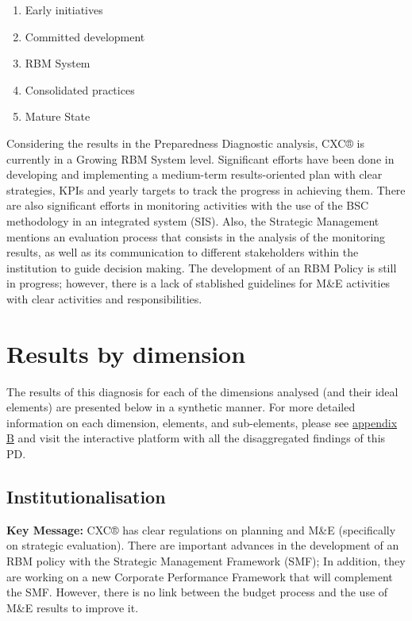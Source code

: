 \documentclass[
  10pt,
]{book}
\providecommand{\tightlist}{%
  \setlength{\itemsep}{0pt}\setlength{\parskip}{0pt}}
\begin{document}
\begin{enumerate}
\def\labelenumi{\arabic{enumi}.}
\tightlist
\item
  Early initiatives
\item
  Committed development
\item
  RBM System
\item
  Consolidated practices
\item
  Mature State
\end{enumerate}

Considering the results in the Preparedness Diagnostic analysis, CXC® is currently in a Growing RBM System level. Significant efforts have been done in developing and implementing a medium-term results-oriented plan with clear strategies, KPIs and yearly targets to track the progress in achieving them. There are also significant efforts in monitoring activities with the use of the BSC methodology in an integrated system (SIS). Also, the Strategic Management mentions an evaluation process that consists in the analysis of the monitoring results, as well as its communication to different stakeholders within the institution to guide decision making. The development of an RBM Policy is still in progress; however, there is a lack of stablished guidelines for M\&E activities with clear activities and responsibilities.

\hypertarget{results-by-dimension}{%
\section{Results by dimension}\label{results-by-dimension}}

The results of this diagnosis for each of the dimensions analysed (and their ideal elements) are presented below in a synthetic manner. For more detailed information on each dimension, elements, and sub-elements, please see \protect\hyperlink{appendixB}{appendix B} and visit the interactive platform with all the disaggregated findings of this PD.

\hypertarget{institutionalisation}{%
\subsection{Institutionalisation}\label{institutionalisation}}

\textbf{Key Message:}
CXC® has clear regulations on planning and M\&E (specifically on strategic evaluation). There are important advances in the development of an RBM policy with the Strategic Management Framework (SMF); In addition, they are working on a new Corporate Performance Framework that will complement the SMF. However, there is no link between the budget process and the use of M\&E results to improve it.
\end{document}
